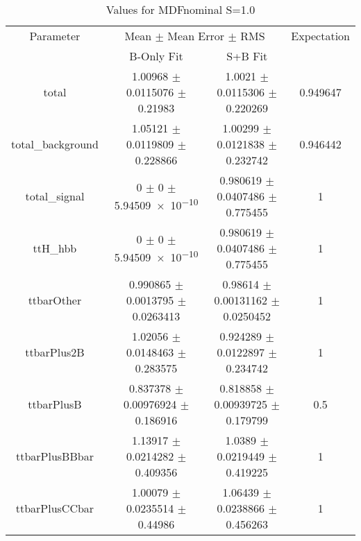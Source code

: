 \begin{table}
\centering
\caption{Values for MDFnominal S=1.0}
\begin{tabular}{cccc}
\toprule
Parameter & \multicolumn{2}{c}{Mean $\pm$ Mean Error $\pm$ RMS} & Expectation\\
 & B-Only Fit & S+B Fit & \\
\midrule
total & \num{1.00968} $\pm$ \num{0.0115076} $\pm$ \num{0.21983} & \num{1.0021} $\pm$ \num{0.0115306} $\pm$ \num{0.220269} & \num{0.949647}\\
total\_background & \num{1.05121} $\pm$ \num{0.0119809} $\pm$ \num{0.228866} & \num{1.00299} $\pm$ \num{0.0121838} $\pm$ \num{0.232742} & \num{0.946442}\\
total\_signal & \num{0} $\pm$ \num{0} $\pm$ \num{5.94509e-10} & \num{0.980619} $\pm$ \num{0.0407486} $\pm$ \num{0.775455} & \num{1}\\
ttH\_hbb & \num{0} $\pm$ \num{0} $\pm$ \num{5.94509e-10} & \num{0.980619} $\pm$ \num{0.0407486} $\pm$ \num{0.775455} & \num{1}\\
ttbarOther & \num{0.990865} $\pm$ \num{0.0013795} $\pm$ \num{0.0263413} & \num{0.98614} $\pm$ \num{0.00131162} $\pm$ \num{0.0250452} & \num{1}\\
ttbarPlus2B & \num{1.02056} $\pm$ \num{0.0148463} $\pm$ \num{0.283575} & \num{0.924289} $\pm$ \num{0.0122897} $\pm$ \num{0.234742} & \num{1}\\
ttbarPlusB & \num{0.837378} $\pm$ \num{0.00976924} $\pm$ \num{0.186916} & \num{0.818858} $\pm$ \num{0.00939725} $\pm$ \num{0.179799} & \num{0.5}\\
ttbarPlusBBbar & \num{1.13917} $\pm$ \num{0.0214282} $\pm$ \num{0.409356} & \num{1.0389} $\pm$ \num{0.0219449} $\pm$ \num{0.419225} & \num{1}\\
ttbarPlusCCbar & \num{1.00079} $\pm$ \num{0.0235514} $\pm$ \num{0.44986} & \num{1.06439} $\pm$ \num{0.0238866} $\pm$ \num{0.456263} & \num{1}\\
\bottomrule
\end{tabular}
\end{table}